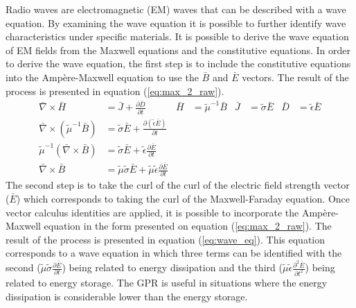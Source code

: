 \documentclass{article}
\begin{document}
Radio waves are electromagnetic (EM) waves that can be described with a wave equation. By examining the wave equation it is possible to further identify wave characteristics under specific materials. It is possible to derive the wave equation of EM fields from the Maxwell equations and the constitutive equations. In order to derive the wave equation, the first step is to include the constitutive equations into the Ampère-Maxwell equation to use the $\bar{B}$ and $\bar{E}$ vectors. The result of the process is presented in equation (\ref{eq:max_2_raw}).
\begin{align}
    \bar{\nabla} \times \bar{H} &= \bar{J} + \frac{\partial \bar{D}}{\partial t} & \bar{H} &= \tilde{\mu}^{-1} \bar{B} & \bar{J} &= \tilde{\sigma} \bar{E} & \bar{D} &= \tilde{\epsilon} \bar{E} \nonumber \\
    \bar{\nabla} \times (\tilde{\mu}^{-1} \bar{B}) &= \tilde{\sigma} \bar{E} + \frac{\partial (\tilde{\epsilon} \bar{E})}{\partial t} \nonumber \\
    \tilde{\mu}^{-1} (\bar{\nabla} \times \bar{B}) &= \tilde{\sigma} \bar{E} + \tilde{\epsilon} \frac{\partial \bar{E}}{\partial t} \nonumber \\
    \bar{\nabla} \times \bar{B} &= \tilde{\mu} \tilde{\sigma} \bar{E} + \tilde{\mu} \tilde{\epsilon} \frac{\partial \bar{E}}{\partial t} \label{eq:max_2_raw}
\end{align}
The second step is to take the curl of the curl of the electric field strength vector ($\bar{E}$) which corresponds to taking the curl of the Maxwell-Faraday equation. Once vector calculus identities are applied, it is possible to incorporate the Ampère-Maxwell equation in the form presented on equation (\ref{eq:max_2_raw}). The result of the process is presented in equation (\ref{eq:wave_eq}). This equation corresponds to a wave equation in which three terms can be identified with the second ($ \tilde{\mu} \tilde{\sigma} \frac{\partial \bar{E}}{\partial t}$) being related to energy dissipation and the third ($\tilde{\mu} \tilde{\epsilon} \frac{\partial^{2} \bar{E}}{\partial t^{2}}$) being related to energy storage. The GPR is useful in situations where the energy dissipation is considerable lower than the energy storage.
\end{document}
